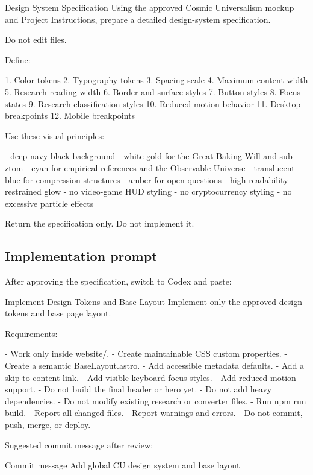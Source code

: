 \documentclass[11pt,letterpaper]{article}
\begin{document}
\begin{promptbox}{Design System Specification}
Using the approved Cosmic Universalism mockup and Project
Instructions, prepare a detailed design-system specification.

Do not edit files.

Define:

1. Color tokens
2. Typography tokens
3. Spacing scale
4. Maximum content width
5. Research reading width
6. Border and surface styles
7. Button styles
8. Focus states
9. Research classification styles
10. Reduced-motion behavior
11. Desktop breakpoints
12. Mobile breakpoints

Use these visual principles:

- deep navy-black background
- white-gold for the Great Baking Will and sub-ztom
- cyan for empirical references and the Observable Universe
- translucent blue for compression structures
- amber for open questions
- high readability
- restrained glow
- no video-game HUD styling
- no cryptocurrency styling
- no excessive particle effects

Return the specification only.
Do not implement it.
\end{promptbox}

\subsection{Implementation prompt}

After approving the specification, switch to Codex and paste:

\begin{promptbox}{Implement Design Tokens and Base Layout}
Implement only the approved design tokens and base page layout.

Requirements:

- Work only inside website/.
- Create maintainable CSS custom properties.
- Create a semantic BaseLayout.astro.
- Add accessible metadata defaults.
- Add a skip-to-content link.
- Add visible keyboard focus styles.
- Add reduced-motion support.
- Do not build the final header or hero yet.
- Do not add heavy dependencies.
- Do not modify existing research or converter files.
- Run npm run build.
- Report all changed files.
- Report warnings and errors.
- Do not commit, push, merge, or deploy.
\end{promptbox}

Suggested commit message after review:

\begin{codebox}{Commit message}
Add global CU design system and base layout
\end{codebox}
\end{document}
